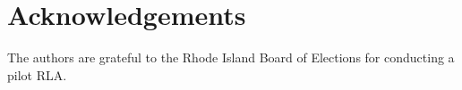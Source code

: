 \section{Acknowledgements}
\label{sec:ack}
The authors are grateful to the Rhode Island Board of Elections for conducting a pilot \Providence RLA. 

%
%
%
%
%
%
%

